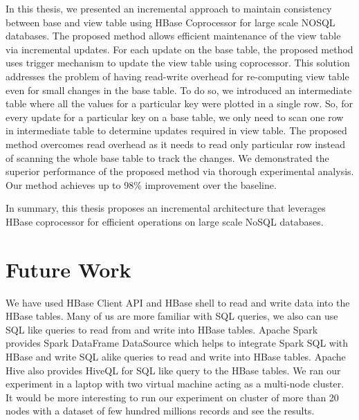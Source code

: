 \documentclass[11pt,a4paper,bibtotoc,idxtotoc,headsepline,footsepline,footexclude,BCOR12mm,DIV13]{scrbook}
\begin{document}
In this thesis, we presented an incremental approach to maintain consistency between base and view table using HBase Coprocessor for large scale NOSQL databases. The proposed method allows efficient maintenance of the view table via incremental updates. For each update on the base table, the proposed method uses trigger mechanism to update the view table using coprocessor. This solution addresses the problem of having read-write overhead for re-computing view table even for small changes in the base table. To do so, we introduced an intermediate table where all the values for a particular key were plotted in a single row. So, for every update for a particular key on a base table, we only need to scan one row in intermediate table to determine updates required in view table. The proposed method overcomes read overhead as it needs to read only particular row instead of scanning the whole base table to track the changes. We demonstrated the superior performance of the proposed method via thorough experimental analysis. Our method achieves up to 98\%  improvement over the baseline.  

In summary, this thesis proposes an incremental architecture that leverages HBase coprocessor for efficient operations on large scale NoSQL databases.



\chapter{Future Work}
\label{Future Work}
We have used HBase Client API and HBase shell to read and write data into the HBase tables. Many of us are more familiar with SQL queries, we also can use SQL like queries to read from and write into HBase tables. Apache Spark provides Spark DataFrame DataSource which helps to integrate Spark SQL with HBase and write SQL alike queries to read and write into HBase tables. Apache Hive also provides HiveQL for SQL like query to the HBase tables. 
\newline
We ran our experiment in a laptop with two virtual machine acting as a multi-node cluster. It would be more interesting to run our experiment on cluster of more than 20 nodes with a  dataset of few hundred millions records and see the results.


\cleardoublepage
{}
{}
\listoffigures
\cleardoublepage
{}
{}
\listoftables
\cleardoublepage
{}

\end{document}
